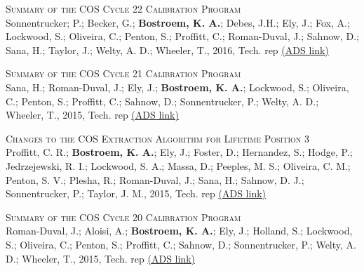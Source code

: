 \vspace{-0.1in}   
\begin{revnumerate}[24]
\item{\textsc{Summary of the COS Cycle 22 Calibration Program}\\
Sonnentrucker; P.; Becker, G.; {\bf Bostroem, K. A.}; Debes, J.H.; Ely, J.; Fox, A.; Lockwood, S.; Oliveira, C.; Penton, S.; Proffitt, C.; Roman-Duval, J.; Sahnow, D.; Sana, H.; Taylor, J.; Welty, A. D.; Wheeler, T., 2016, Tech. rep 
\color{blue}\href{https://ui.adsabs.harvard.edu/abs/2016cos..rept....3S/abstract}{(ADS link)}\color{black}}\\ %
\item{\textsc{Summary of the COS Cycle 21 Calibration Program}\\
Sana, H.; Roman-Duval, J.; Ely, J.; {\bf Bostroem, K. A.}; Lockwood, S.; Oliveira, C.; Penton, S.; Proffitt, C.; Sahnow, D.; Sonnentrucker, P.; Welty, A. D.; Wheeler, T., 2015, Tech. rep 
\color{blue}\href{https://ui.adsabs.harvard.edu/abs/2015cos..rept....6S/abstract}{(ADS link)}\color{black}}\\ %

\item{\textsc{Changes to the COS Extraction Algorithm for Lifetime Position 3}\\
Proffitt, C. R.; {\bf Bostroem, K. A.}; Ely, J.; Foster, D.; Hernandez, S.; Hodge, P.; Jedrzejewski, R. I.; Lockwood, S. A.; Massa, D.; Peeples, M. S.; Oliveira, C. M.; Penton, S. V.; Plesha, R.; Roman-Duval, J.; Sana, H.; Sahnow, D. J.; Sonnentrucker, P.; Taylor, J. M.,  2015, Tech. rep 
\color{blue}\href{https://ui.adsabs.harvard.edu/abs/2015cos..rept....3P/abstract}{(ADS link)}\color{black}}\\ %

\item{\textsc{Summary of the COS Cycle 20 Calibration Program}\\
Roman-Duval, J.; Aloisi, A.; {\bf Bostroem, K. A.}; Ely, J.; Holland, S.; Lockwood, S.; Oliveira, C.; Penton, S.; Proffitt, C.; Sahnow, D.; Sonnentrucker, P.; Welty, A. D.; Wheeler, T., 2015, Tech. rep 
\color{blue}\href{https://ui.adsabs.harvard.edu/abs/2015cos..rept....2R/abstract}{(ADS link)}\color{black}}\\ %


\end{revnumerate}

